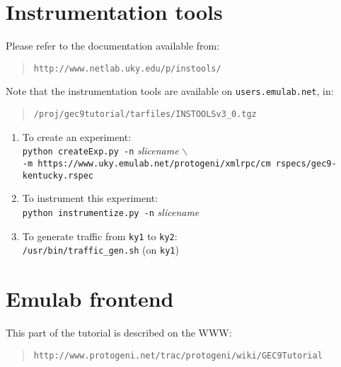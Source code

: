 \documentclass{article}
\begin{document}
\section{Instrumentation tools}
Please refer to the documentation available from:
\begin{quote}{\tt http://www.netlab.uky.edu/p/instools/}\end{quote}
\noindent{}Note that the instrumentation tools are available on {\tt users.emulab.net}, in:
\begin{quote}{\tt /proj/gec9tutorial/tarfiles/INSTOOLSv3\_0.tgz}\end{quote}
\begin{enumerate}
\item To create an experiment:\\
{\tt python createExp.py -n} \emph{slicename} {\tt $\backslash$}\\
{\tt -m https://www.uky.emulab.net/protogeni/xmlrpc/cm
rspecs/gec9-kentucky.rspec}
\item To instrument this experiment:\\
{\tt python instrumentize.py -n} \emph{slicename}
\item To generate traffic from {\tt ky1} to {\tt ky2}:\\
{\tt /usr/bin/traffic\_gen.sh} (on {\tt ky1})
\end{enumerate}

\section{Emulab frontend}
This part of the tutorial is described on the WWW:
\begin{quote}{\tt http://www.protogeni.net/trac/protogeni/wiki/GEC9Tutorial}\end{quote}
\end{document}
